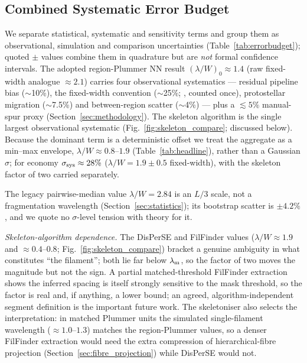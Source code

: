 \documentclass[usenatbib,twoside,twocolumn]{mnras}
\begin{document}
\subsection{Combined Systematic Error Budget}
\label{sec:error_budget}

We separate statistical, systematic and sensitivity terms and group them as observational, simulation and comparison uncertainties (Table~\ref{tab:errorbudget}); quoted $\pm$ values combine them in quadrature but are \emph{not} formal confidence intervals. The adopted region-Plummer NN result $(\lambda/W)_0\approx1.4$ (raw fixed-width analogue $\approx2.1$) carries four observational systematics --- residual pipeline bias ($\sim$10\%), the fixed-width convention ($\sim$25\%; \citealt{Panopoulou2022}, counted once), protostellar migration ($\sim$7.5\%) and between-region scatter ($\sim$4\%) --- plus a $\lesssim5\%$ manual-spur proxy (Section~\ref{sec:methodology}). The skeleton algorithm is the single largest observational systematic (Fig.~\ref{fig:skeleton_compare}; discussed below). Because the dominant term is a deterministic offset we treat the aggregate as a min--max envelope, $\lambda/W\approx0.8$--$1.9$ (Table~\ref{tab:headline}), rather than a Gaussian $\sigma$; for economy $\sigma_{\rm sys}\approx28\%$ ($\lambda/W=1.9\pm0.5$ fixed-width), with the skeleton factor of two carried separately.


The legacy pairwise-median value $\lambda/W=2.84$ is an $L/3$ scale, not a fragmentation wavelength (Section~\ref{sec:statistics}); its bootstrap scatter is $\pm4.2\%$, and we quote no $\sigma$-level tension with theory for it.

\emph{Skeleton-algorithm dependence.} The DisPerSE and FilFinder values ($\lambda/W\approx1.9$ and $\approx0.4$--$0.8$; Fig.~\ref{fig:skeleton_compare}) bracket a genuine ambiguity in what constitutes ``the filament''; both lie far below $\lambda_{\rm m}$, so the factor of two moves the magnitude but not the sign. A partial matched-threshold FilFinder extraction shows the inferred spacing is itself strongly sensitive to the mask threshold, so the factor is real and, if anything, a lower bound; an agreed, algorithm-independent segment definition is the important future work. The skeletoniser also selects the interpretation: in matched Plummer units the simulated single-filament wavelength ($\approx1.0$--$1.3$) matches the region-Plummer values, so a denser FilFinder extraction would need the extra compression of hierarchical-fibre projection (Section~\ref{sec:fibre_projection}) while DisPerSE would not.
\end{document}
